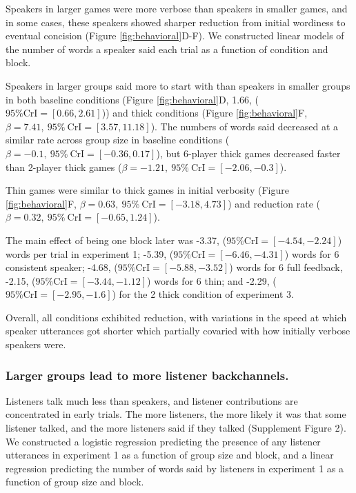 \documentclass[
  english,
  a4paper,
]{article}
\begin{document}
Speakers in larger games were more verbose than speakers in smaller games, and in some cases, these speakers showed sharper reduction from initial wordiness to eventual concision (Figure \ref{fig:behavioral}D-F). We constructed linear models of the number of words a speaker said each trial as a function of condition and block.

Speakers in larger groups said more to start with than speakers in smaller groups in both baseline conditions (Figure \ref{fig:behavioral}D, 1.66, (\(95\%\mathrm{CrI}=[0.66, 2.61]\))) and thick conditions (Figure \ref{fig:behavioral}F, \(\beta=7.41,\:95\%\:\mathrm{CrI}=[3.57, 11.18]\)). The numbers of words said decreased at a similar rate across group size in baseline conditions (\(\beta=-0.1,\:95\%\:\mathrm{CrI}=[-0.36, 0.17]\)), but 6-player thick games decreased faster than 2-player thick games (\(\beta=-1.21,\:95\%\:\mathrm{CrI}=[-2.06, -0.3]\)).

Thin games were similar to thick games in initial verbosity (Figure \ref{fig:behavioral}F, \(\beta=0.63,\:95\%\:\mathrm{CrI}=[-3.18, 4.73]\)) and reduction rate ( \(\beta=0.32,\:95\%\:\mathrm{CrI}=[-0.65, 1.24]\)).

The main effect of being one block later was -3.37, (\(95\%\mathrm{CrI}=[-4.54, -2.24]\)) words per trial in experiment 1; -5.39, (\(95\%\mathrm{CrI}=[-6.46, -4.31]\)) words for 6 consistent speaker; -4.68, (\(95\%\mathrm{CrI}=[-5.88, -3.52]\)) words for 6 full feedback, -2.15, (\(95\%\mathrm{CrI}=[-3.44, -1.12]\)) words for 6 thin; and -2.29, (\(95\%\mathrm{CrI}=[-2.95, -1.6]\)) for the 2 thick condition of experiment 3.

Overall, all conditions exhibited reduction, with variations in the speed at which speaker utterances got shorter which partially covaried with how initially verbose speakers were.

\hypertarget{larger-groups-lead-to-more-listener-backchannels.}{%
\subsubsection{Larger groups lead to more listener backchannels.}\label{larger-groups-lead-to-more-listener-backchannels.}}

Listeners talk much less than speakers, and listener contributions are concentrated in early trials. The more listeners, the more likely it was that some listener talked, and the more listeners said if they talked (Supplement Figure 2). We constructed a logistic regression predicting the presence of any listener utterances in experiment 1 as a function of group size and block, and a linear regression predicting the number of words said by listeners in experiment 1 as a function of group size and block.
\end{document}
